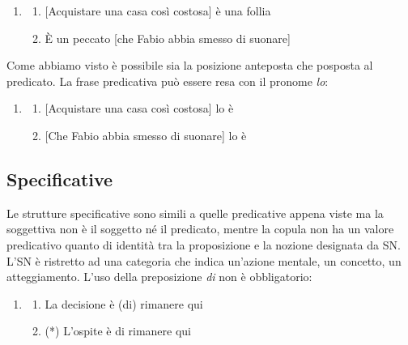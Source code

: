 \documentclass[
  a4paper,
  twoside,
  11pt,
  chapterprefix=false,
  bibliography=totocnumbered,
  listof=flat]{scrbook}
\providecommand{\tightlist}{%
  \setlength{\itemsep}{0pt}\setlength{\parskip}{0pt}}
\begin{document}
\begin{enumerate}
\def\labelenumi{(\arabic{enumi})}
\setcounter{enumi}{32}
\item
  \begin{enumerate}
  \def\labelenumii{\alph{enumii}.}
  \tightlist
  \item
    {[}Acquistare una casa così costosa{]} è una follia
  \item
    È un peccato {[}che Fabio abbia smesso di suonare{]}
  \end{enumerate}
\end{enumerate}

Come abbiamo visto è possibile sia la posizione anteposta che posposta al predicato. La frase predicativa può essere resa con il pronome \emph{lo}:

\begin{enumerate}
\def\labelenumi{(\arabic{enumi})}
\setcounter{enumi}{33}
\item
  \begin{enumerate}
  \def\labelenumii{\alph{enumii}.}
  \tightlist
  \item
    {[}Acquistare una casa così costosa{]} lo è
  \item
    {[}Che Fabio abbia smesso di suonare{]} lo è
  \end{enumerate}
\end{enumerate}

\hypertarget{specificative}{%
\subsection{Specificative}\label{specificative}}

Le strutture specificative sono simili a quelle predicative appena viste ma la soggettiva non è il soggetto né il predicato, mentre la copula non ha un valore predicativo quanto di identità tra la proposizione e la nozione designata da SN. L'SN è ristretto ad una categoria che indica un'azione mentale, un concetto, un atteggiamento. L'uso della preposizione \emph{di} non è obbligatorio:

\begin{enumerate}
\def\labelenumi{(\arabic{enumi})}
\setcounter{enumi}{34}
\item
  \begin{enumerate}
  \def\labelenumii{\alph{enumii}.}
  \tightlist
  \item
    La decisione è (di) rimanere qui
  \item
    (*) L'ospite è di rimanere qui
  \end{enumerate}
\end{enumerate}
\end{document}
